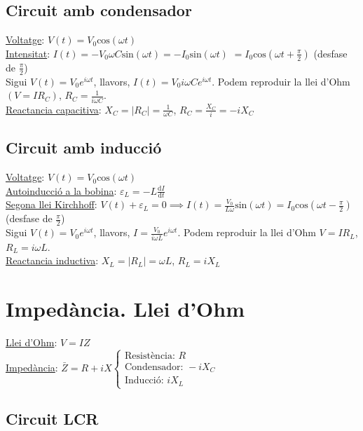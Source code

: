 \documentclass[12pt]{article}
\begin{document}
\begin{multicols}{5}
\subsection{Circuit amb condensador}
\underline{Voltatge}: $V(t) = V_0\text{cos}(\omega t)$ \\
\underline{Intensitat}: $I(t) = -V_0\omega C \text{sin}(\omega t) = -I_0\text{sin}(\omega t)$ $= I_0\text{cos}(\omega t + \frac{\pi}{2})$ (desfase de $\frac{\pi}{2}$) \\
Sigui $V(t) = V_0 e^{i\omega t}$, llavors, $I(t) = V_0i\omega Ce^{i\omega t}$. Podem reproduir la llei d'Ohm $(V=IR_C)$, $R_C = \frac{1}{i\omega C}$.\\
\underline{Reactancia capacitiva}: $X_C = \vert R_C\vert = \frac{1}{\omega C}$, $R_C = \frac{X_C}{i} = -iX_C$

\subsection{Circuit amb inducció}
\underline{Voltatge}: $V(t) = V_0\text{cos}(\omega t)$ \\
\underline{Autoinducció a la bobina}: $\varepsilon_L = -L \frac{\text{d}I}{\text{d}t}$ \\
\underline{Segona llei Kirchhoff}: $V(t) + \varepsilon_L = 0 \implies I(t) = \frac{V_0}{L\omega}\text{sin}(\omega t) = I_0\text{cos}(\omega t - \frac{\pi}{2})$ (desfase de $\frac{\pi}{2}$) \\
Sigui $V(t) = V_0e^{i\omega t}$, llavors, $I = \frac{V_0}{i\omega L}e^{i\omega t}$. Podem reproduir la llei d'Ohm $V=IR_L$, $R_L=i\omega L$. \\
\underline{Reactancia inductiva}: $X_L = \vert R_L\vert = \omega L$, $R_L = iX_L$

\section{Impedància. Llei d'Ohm}

\underline{Llei d'Ohm}: $V = IZ$ \\
\underline{Impedància}: $\bar{Z} = R + iX \begin{cases} \text{Resistència: } R \\ \text{Condensador: } -iX_C \\ \text{Inducció: } iX_L \end{cases}$

\subsection{Circuit LCR}


\end{multicols}
\end{document}
